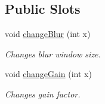 \subsection*{Public Slots}
\begin{DoxyCompactItemize}
\item 
void \hyperlink{class_module_filters_a3d8459413e7eb9d0da7a8743d39bf694}{changeBlur} (int x)
\begin{DoxyCompactList}\small\item\em Changes blur window size. \item\end{DoxyCompactList}\item 
void \hyperlink{class_module_filters_a547475563733e9b3a0923af5ad7e6edd}{changeGain} (int x)
\begin{DoxyCompactList}\small\item\em Changes gain factor. \item\end{DoxyCompactList}\end{DoxyCompactItemize}

